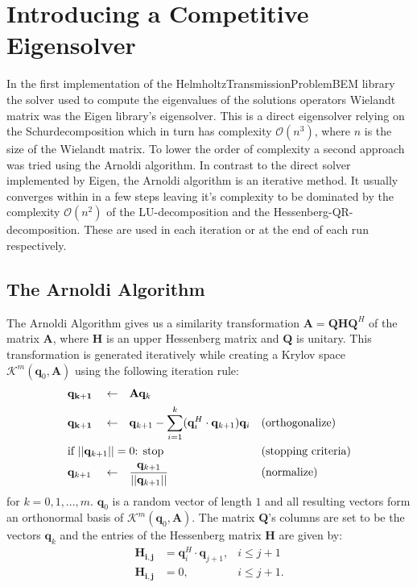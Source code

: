 \documentclass[a4paper, oneside]{thirdparty_stylesheets/discothesis}
\begin{document}
\chapter{Introducing a Competitive Eigensolver}
In the first implementation of the HelmholtzTransmissionProblemBEM library the solver used to compute the eigenvalues of the solutions operators Wielandt matrix was the Eigen library's eigensolver.
This is a direct eigensolver relying on the Schurdecomposition which in turn has complexity $\mathcal{O}(n^3)$, where $n$ is the size of the Wielandt matrix.
To lower the order of complexity a second approach was tried using the Arnoldi algorithm. 
In contrast to the direct solver implemented by Eigen, the Arnoldi algorithm is an iterative method.
It usually converges within in a few steps leaving it's complexity to be dominated by the complexity $\mathcal{O}(n^2)$ of the LU-decomposition and the Hessenberg-QR-decomposition.
These are used in each iteration or at the end of each run respectively.

\section{The Arnoldi Algorithm}
The Arnoldi Algorithm gives us a similarity transformation $\mathbf{A}=\mathbf{QHQ}^H$ of the matrix $\mathbf{A}$, where $\mathbf{H}$ is an upper Hessenberg matrix and $\mathbf{Q}$ is unitary.
This transformation is generated iteratively while creating a Krylov space $\mathcal{K}^{m}(\mathbf{q}_0, \mathbf{A})$ using the following iteration rule:
\begin{align}
	&\mathbf{q_{k+1}}&  &\leftarrow& &\mathbf{A}\mathbf{q}_{k}& & \label{eq:arit1}\\
	&\mathbf{q_{k+1}}&  &\leftarrow& &\mathbf{q}_{k+1} - \sum_{i=1}^{k} (\mathbf{q}_i^H \cdot \mathbf{q}_{k+1}) \mathbf{q}_i& & \text{(orthogonalize)}\\
	& \text{if } ||\mathbf{q}_{k+1}||=0 \text{: stop} \span\span\span\span& &\text{(stopping criteria)} \\
	& \mathbf{q}_{k+1}& &\leftarrow& &\frac{\mathbf{q}_{k+1}}{||\mathbf{q}_{k+1}||}& &\text{(normalize)} \label{eq:arit2}
\end{align}
for $k=0,1,...,m$. $\mathbf{q}_0$ is a random vector of length $1$ and all resulting vectors form an orthonormal basis of $\mathcal{K}^m(\mathbf{q}_0,\mathbf{A})$.
The matrix $\mathbf{Q}$'s columns are set to be the vectors $\mathbf{q}_k$ and the entries of the Hessenberg matrix $\mathbf{H}$ are given by:
\begin{align}
	\mathbf{H_{i,j}}& = \mathbf{q}_i^H \cdot \mathbf{q}_{j+1},& i \leq j+1 \\
	\mathbf{H_{i,j}}& = 0,& i \leq j+1.
\end{align}
\end{document}
